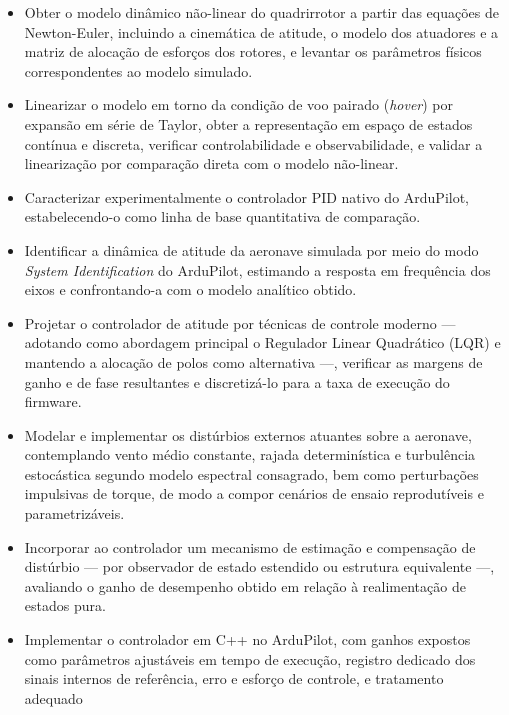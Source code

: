 \documentclass[12pt,a4paper]{article}
\begin{document}
\begin{itemize}[leftmargin=1.2cm,topsep=2pt]
    \item Obter o modelo dinâmico não-linear do quadrirrotor a partir das equações
          de Newton-Euler, incluindo a cinemática de atitude, o modelo dos
          atuadores e a matriz de alocação de esforços dos rotores, e levantar os
          parâmetros físicos correspondentes ao modelo simulado.
    \item Linearizar o modelo em torno da condição de voo pairado
          (\emph{hover}) por expansão em série de Taylor, obter a representação em
          espaço de estados contínua e discreta, verificar controlabilidade e
          observabilidade, e validar a linearização por comparação direta com o
          modelo não-linear.
    \item Caracterizar experimentalmente o controlador PID nativo do ArduPilot,
          estabelecendo-o como linha de base quantitativa de comparação.
    \item Identificar a dinâmica de atitude da aeronave simulada por meio do modo
          \emph{System Identification} do ArduPilot, estimando a resposta em
          frequência dos eixos e confrontando-a com o modelo analítico obtido.
    \item Projetar o controlador de atitude por técnicas de controle moderno ---
          adotando como abordagem principal o Regulador Linear Quadrático (LQR) e
          mantendo a alocação de polos como alternativa ---, verificar as margens de
          ganho e de fase resultantes e discretizá-lo para a taxa de execução do
          firmware.
    \item Modelar e implementar os distúrbios externos atuantes sobre a aeronave,
          contemplando vento médio constante, rajada determinística e turbulência
          estocástica segundo modelo espectral consagrado, bem como perturbações
          impulsivas de torque, de modo a compor cenários de ensaio reprodutíveis e
          parametrizáveis.
    \item Incorporar ao controlador um mecanismo de estimação e compensação de
          distúrbio --- por observador de estado estendido ou estrutura equivalente
          ---, avaliando o ganho de desempenho obtido em relação à realimentação de
          estados pura.
    \item Implementar o controlador em C++ no ArduPilot, com ganhos expostos como
          parâmetros ajustáveis em tempo de execução, registro dedicado dos sinais
          internos de referência, erro e esforço de controle, e tratamento adequado

\end{itemize}
\end{document}
